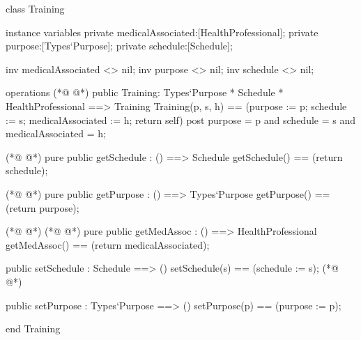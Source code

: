 \begin{vdmpp}[breaklines=true]
class Training
 
instance variables
 private medicalAssociated:[HealthProfessional];
 private purpose:[Types`Purpose];
 private schedule:[Schedule];

 inv medicalAssociated <> nil;
 inv purpose <> nil;
 inv schedule <> nil;

operations
(*@
\label{Training:13}
@*)
 public Training: Types`Purpose * Schedule * HealthProfessional ==> Training
   Training(p, s, h) == (purpose := p; schedule := s; medicalAssociated := h; return self)
 post purpose = p and schedule = s and medicalAssociated = h;

(*@
\label{getSchedule:17}
@*)
 pure public getSchedule : () ==> Schedule
   getSchedule() == (return schedule);
 
(*@
\label{getPurpose:20}
@*)
  pure public getPurpose : () ==> Types`Purpose
  getPurpose() == (return purpose); 
 
(*@
\label{addMedicalAssociated:23}
@*)
(*@
\label{getMedAssoc:23}
@*)
 pure public getMedAssoc : () ==> HealthProfessional
  getMedAssoc() == (return medicalAssociated); 

 public setSchedule : Schedule ==> ()
   setSchedule(s) == (schedule := s);
(*@
\label{removeMedicalAssociated:28}
@*)
 
 public setPurpose : Types`Purpose ==> ()
   setPurpose(p) == (purpose := p);
 
 end Training
\end{vdmpp}

